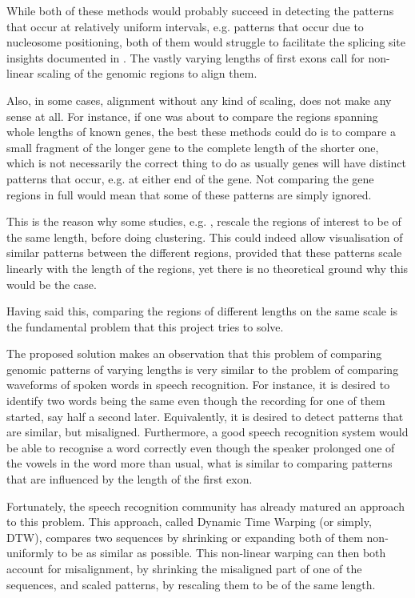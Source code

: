 \documentclass[parskip]{cs4rep}
\begin{document}
While both of these methods would probably succeed in detecting the patterns that occur at relatively uniform intervals, e.g. patterns that occur due to nucleosome positioning, both of them would struggle to facilitate the splicing site insights documented in \cite{Bieberstein:2012tf}. The vastly varying lengths of first exons call for non-linear scaling of the genomic regions to align them.

Also, in some cases, alignment without any kind of scaling, does not make any sense at all. For instance, if one was about to compare the regions spanning whole lengths of known genes, the best these methods could do is to compare a small fragment of the longer gene to the complete length of the shorter one, which is not necessarily the correct thing to do as usually genes will have distinct patterns that occur, e.g. at either end of the gene. Not comparing the gene regions in full would mean that some of these patterns are simply ignored.

This is the reason why some studies, e.g. \cite{Taslim:vj}, rescale the regions of interest to be of the same length, before doing clustering. This could indeed allow visualisation of similar patterns between the different regions, provided that these patterns scale linearly with the length of the regions, yet there is no theoretical ground why this would be the case.

Having said this, comparing the regions of different lengths on the same scale is the fundamental problem that this project tries to solve.

The proposed solution makes an observation that this problem of comparing genomic patterns of varying lengths is very similar to the problem of comparing waveforms of spoken words in speech recognition. 
For instance, it is desired to identify two words being the same even though the recording for one of them started, say half a second later. Equivalently, it is desired to detect patterns that are similar, but misaligned. Furthermore, a good speech recognition system would be able to recognise a word correctly even though the speaker prolonged one of the vowels in the word more than usual, what is similar to comparing patterns that are influenced by the length of the first exon.

Fortunately, the speech recognition community has already matured an approach to this problem. This approach, called Dynamic Time Warping (or simply, DTW), compares two sequences by shrinking or expanding both of them non-uniformly to be as similar as possible. This non-linear warping can then both account for misalignment, by shrinking the misaligned part of one of the sequences, and scaled patterns, by rescaling them to be of the same length. 
\end{document}
